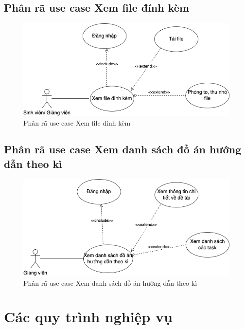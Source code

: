 \documentclass[../Main.tex]{subfiles}
\begin{document}
\subsection{Phân rã use case Xem file đính kèm}

\begin{figure}[H]
   \centering
    \includegraphics[width=0.75\linewidth]{Figure/use_case_xem_file_dinh_kem.png}
    \caption{Phân rã use case Xem file đính kèm}
    \label{fig:use_case_xem_file_dinh_kem}
\end{figure}


\subsection{Phân rã use case Xem danh sách đồ án hướng dẫn theo kì}
\begin{figure}[H]
    \centering
    \includegraphics[width=0.8\linewidth]{Figure/use_case_xem_ds_do_an.png}
    \caption{Phân rã use case Xem danh sách đồ án hướng dẫn theo kì}
    \label{fig:use_case_xem_ds_do_an}
\end{figure}                                                                              

\section{Các quy trình nghiệp vụ}
\end{document}
